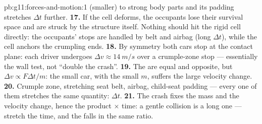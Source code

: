 \begin{solution}{pb:g11:forces-and-motion:1}
(smaller)  to strong body parts and its padding stretches
$\Delta t$ further.
\textbf{17.} If the cell deforms, the occupants lose their survival
space and are struck by the structure itself. Nothing should hit the
rigid cell directly: the occupants' stops are handled by belt and
airbag (long $\Delta t$), while the cell anchors the crumpling ends.
\textbf{18.} By symmetry both cars stop at the contact plane: each
driver undergoes $\Delta v \approx \qty{14}{m/s}$ over a crumple-zone
stop --- essentially the wall test, not ``double the crash''.
\textbf{19.} The  are equal and opposite, but
$\Delta v \propto F\Delta t/m$: the small car, with the small $m$,
suffers the large velocity change.
\textbf{20.} Crumple zone, stretching seat belt, airbag, child-seat
padding --- every one of them stretches the same quantity: $\Delta t$.
\textbf{21.} The crash fixes the mass and the velocity change, hence
the product  $\times$ time: a gentle collision is a long one ---
stretch the time, and the  falls in the same ratio.
\end{solution}
